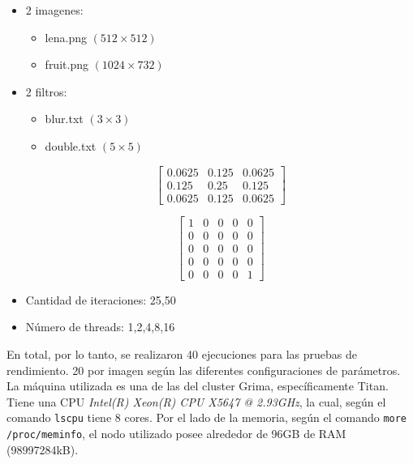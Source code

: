 \documentclass[letterpaper,10pt]{article}
\begin{document}
\begin{itemize}
\item 2 imagenes:
	\begin{itemize}
	\item lena.png $(512 \times 512)$
    \item fruit.png $(1024 \times 732)$
	\end{itemize}
\item 2 filtros:
	\begin{multicols}{2}
    	\begin{itemize}
        	\item blur.txt $(3 \times 3)$
        	\item double.txt $(5 \times 5)$
    	\end{itemize}
    \end{multicols}
    \begin{minipage}{0.5\linewidth}
      \[ \left[
      \begin{array}{ccc}
          0.0625 & 0.125 & 0.0625 \\
          0.125 & 0.25 & 0.125 \\
          0.0625 & 0.125 & 0.0625
      \end{array} \right]
      \]
    \end{minipage}
    \begin{minipage}{0.5\linewidth}
      \[ \left[
      \begin{array}{ccccc}
          1 & 0 & 0 & 0 & 0 \\
          0 & 0 & 0 & 0 & 0 \\
          0 & 0 & 0 & 0 & 0 \\
          0 & 0 & 0 & 0 & 0 \\
          0 & 0 & 0 & 0 & 1
      \end{array} \right]
      \]
    \end{minipage}
\item Cantidad de iteraciones:
  25,50
\item Número de threads:
  1,2,4,8,16
\end{itemize}

En total, por lo tanto, se realizaron 40 ejecuciones para las pruebas de rendimiento. 20 por imagen según las diferentes configuraciones de parámetros.\\

La máquina utilizada es una de las del cluster Grima, específicamente Titan. Tiene una CPU \textit{Intel(R) Xeon(R) CPU X5647 @ 2.93GHz}, la cual, según el comando \texttt{lscpu} tiene 8 cores. Por el lado de la memoria, según el comando \texttt{more /proc/meminfo}, el nodo utilizado posee alrededor de 96GB de RAM (98997284kB).
\end{document}
